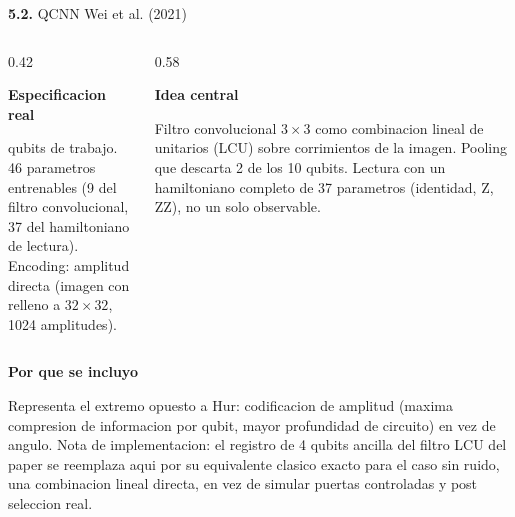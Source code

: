 \documentclass[aspectratio=169]{beamer}
\newcommand{\bmheading}[2]{\textbf{\color{#1}#2}\par\smallskip}
\newcommand{\subsec}[2]{\textbf{\color{bmIndigo}#1.} #2}
\begin{document}
\begin{frame}{\subsec{5.2}{QCNN Wei et al. (2021)}}
  \footnotesize
  \begin{columns}[T]
    \begin{column}{0.42\textwidth}
      \begin{bluebox}
        \bmheading{bmBlue}{Especificacion real}
        10 qubits de trabajo.\\
        46 parametros entrenables (9 del filtro convolucional, 37 del
        hamiltoniano de lectura).\\
        Encoding: amplitud directa (imagen con relleno a $32\times32$, 1024
        amplitudes).
      \end{bluebox}
    \end{column}
    \begin{column}{0.58\textwidth}
      \begin{indigobox}
        \bmheading{bmIndigo}{Idea central}
        Filtro convolucional $3\times3$ como combinacion lineal de unitarios
        (LCU) sobre corrimientos de la imagen. Pooling que descarta 2 de los 10
        qubits. Lectura con un hamiltoniano completo de 37 parametros
        (identidad, Z, ZZ), no un solo observable.
      \end{indigobox}
    \end{column}
  \end{columns}
  \vspace{8pt}
  \begin{amberbox}
    \bmheading{bmAmber}{Por que se incluyo}
    Representa el extremo opuesto a Hur: codificacion de amplitud (maxima
    compresion de informacion por qubit, mayor profundidad de circuito) en vez
    de angulo. Nota de implementacion: el registro de 4 qubits ancilla del
    filtro LCU del paper se reemplaza aqui por su equivalente clasico exacto
    para el caso sin ruido, una combinacion lineal directa, en vez de simular
    puertas controladas y post seleccion real.
  \end{amberbox}
\end{frame}
\end{document}
